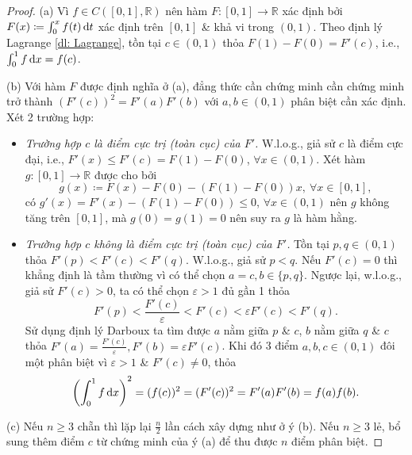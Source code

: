 \documentclass{article}
\begin{document}
\begin{proof}
	(a) Vì $f\in C([0,1],\mathbb{R})$ nên hàm $F:[0,1]\to\mathbb{R}$ xác định bởi $F(x)\coloneqq\int_0^x f(t)\,{\rm d}t$ xác định trên $[0,1]$ \& khả vi trong $(0,1)$. Theo định lý Lagrange \ref{dl: Lagrange}, tồn tại $c\in(0,1)$ thỏa $F(1) - F(0) = F'(c)$, i.e., $\int_0^1 f\,{\rm d}x = f(c)$.
	\item(b) Với hàm $F$ được định nghĩa ở (a),  đẳng thức cần chứng minh cần chứng minh trở thành $(F'(c))^2 = F'(a)F'(b)$ với $a,b\in(0,1)$ phân biệt cần xác định. Xét 2 trường hợp:
	\begin{itemize}
		\item {\it Trường hợp $c$ là điểm cực trị (toàn cục) của $F'$.} W.l.o.g., giả sử $c$ là điểm cực đại, i.e., $F'(x)\le F'(c) = F(1) - F(0)$, $\forall x\in(0,1)$. Xét hàm $g:[0,1]\to\mathbb{R}$ được cho bởi
		\begin{equation*}
			g(x)\coloneqq F(x) - F(0) - (F(1) - F(0))x,\ \forall x\in[0,1],
		\end{equation*}
		có $g'(x) = F'(x) - (F(1) - F(0))\le0$, $\forall x\in(0,1)$ nên $g$ không tăng trên $[0,1]$, mà $g(0) = g(1) = 0$ nên suy ra $g$ là hàm hằng.
		\item {\it Trường hợp $c$ không là điểm cực trị (toàn cục) của $F'$.} Tồn tại $p,q\in(0,1)$ thỏa $F'(p) < F'(c) < F'(q)$. W.l.o.g., giả sử $p < q$. Nếu $F'(c) = 0$ thì khẳng định là tầm thường vì có thể chọn $a = c,b\in\{p,q\}$. Ngược lại, w.l.o.g., giả sử $F'(c) > 0$, ta có thể chọn $\varepsilon > 1$ đủ gần 1 thỏa
		\begin{equation*}
			F'(p) < \frac{F'(c)}{\varepsilon} < F'(c) < \varepsilon F'(c) < F'(q).
		\end{equation*}
		Sử dụng định lý Darboux ta tìm được $a$ nằm giữa $p$ \& $c$, $b$ nằm giữa $q$ \& $c$ thỏa $F'(a) = \frac{F'(c)}{\varepsilon},F'(b) = \varepsilon F'(c)$. Khi đó 3 điểm $a,b,c\in(0,1)$ đôi một phân biệt vì $\varepsilon > 1$ \& $F'(c)\ne0$, thỏa
		\begin{equation*}
			\left(\int_0^1 f\,{\rm d}x\right)^2 = (f(c))^2 = (F'(c))^2 = F'(a)F'(b) = f(a)f(b).
		\end{equation*}
	\end{itemize}
	\item(c) Nếu $n\ge3$ chẵn thì lặp lại $\frac{n}{2}$ lần cách xây dựng như ở ý (b). Nếu $n\ge3$ lẻ, bổ sung thêm điểm $c$ từ chứng minh của ý (a) để thu được $n$ điểm phân biệt.
\end{proof}
\end{document}
